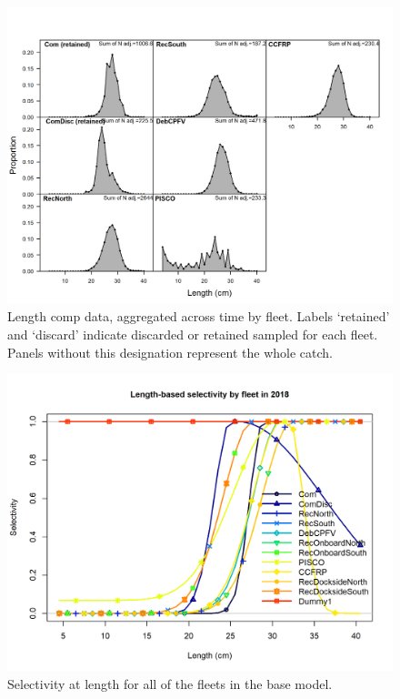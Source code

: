 \documentclass[12pt,]{article}
\begin{document}
\FloatBarrier

\FloatBarrier

\FloatBarrier

\FloatBarrier

\begin{figure}
\centering
\includegraphics{r4ss/plots_mod1/comp_lendat__aggregated_across_time.png}
\caption{Length comp data, aggregated across time by fleet. Labels
`retained' and `discard' indicate discarded or retained sampled for each
fleet. Panels without this designation represent the whole catch.
\label{fig:comp_lendat_aggregated_across_time}}
\end{figure}

\FloatBarrier

\FloatBarrier

\FloatBarrier

\FloatBarrier

\begin{figure}
\centering
\includegraphics{r4ss/plots_mod1/sel01_multiple_fleets_length1.png}
\caption{Selectivity at length for all of the fleets in the base model.
\label{fig:sel01_multiple_fleets_length1}}
\end{figure}
\end{document}
